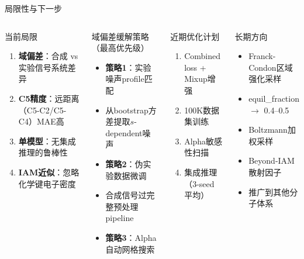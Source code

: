 \documentclass[aspectratio=169,9pt]{beamer}
\begin{document}
\begin{frame}{局限性与下一步}
  \begin{columns}[T]
    \begin{alertblock}{当前局限}
      \scriptsize
      \begin{enumerate}
        \item \textbf{域偏差}：合成 vs 实验信号系统差异
        \item \textbf{C5精度}：远距离（C5-C2/C5-C4）MAE高
        \item \textbf{单模型}：无集成推理的鲁棒性
        \item \textbf{IAM近似}：忽略化学键电子密度
      \end{enumerate}
    \end{alertblock}

    \begin{block}{域偏差缓解策略（最高优先级）}
      \scriptsize
      \begin{itemize}
        \item \textbf{策略1}：实验噪声profile匹配
        \item 从bootstrap方差提取$s$-dependent噪声
        \item \textbf{策略2}：伪实验数据微调
        \item 合成信号过完整预处理pipeline
        \item \textbf{策略3}：Alpha自动网格搜索
      \end{itemize}
    \end{block}

    \begin{exampleblock}{近期优化计划}
      \scriptsize
      \begin{enumerate}
        \item Combined loss + Mixup增强
        \item 100K数据集训练
        \item Alpha敏感性扫描
        \item 集成推理（3-seed平均）
      \end{enumerate}
    \end{exampleblock}

    \begin{block}{长期方向}
      \scriptsize
      \begin{itemize}
        \item Franck-Condon区域强化采样
        \item equil\_fraction $\to$ 0.4--0.5
        \item Boltzmann加权采样
        \item Beyond-IAM散射因子
        \item 推广到其他分子体系
      \end{itemize}
    \end{block}
  \end{columns}
\end{frame}
\end{document}
